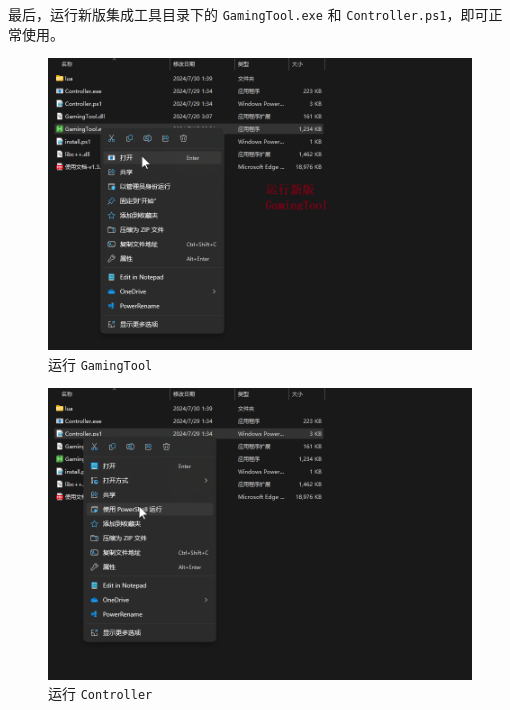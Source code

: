 最后，运行新版集成工具目录下的 \lstinline{GamingTool.exe} 和 \lstinline{Controller.ps1}，即可正常使用。

\begin{figure}[H]
    \Centering
    \includegraphics[width=\textwidth]{docs/assets/update/run_new_gamingtool.png}
    \caption{运行 \lstinline{GamingTool}}
\end{figure}

\begin{figure}[H]
    \Centering
    \includegraphics[width=\textwidth]{docs/assets/update/run_new_controller.png}
    \caption{运行 \lstinline{Controller}}
\end{figure}
